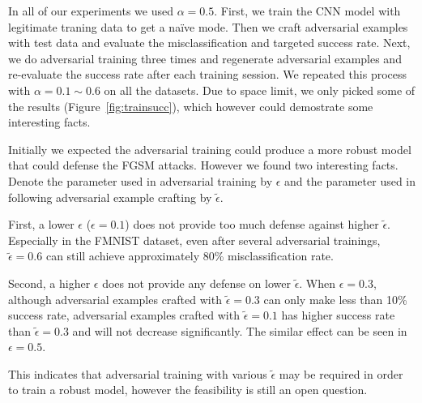 \documentclass{article}
\begin{document}
In all of our experiments we used $\alpha=0.5$. First, we train the CNN model with legitimate traning data to get a na\"ive mode.
Then we craft adversarial examples with test data and evaluate the misclassification and targeted success rate.
Next, we do adversarial training three times and regenerate adversarial examples and re-evaluate the success rate after each training session.
We repeated this process with $\alpha=0.1\sim 0.6$ on all the datasets.
Due to space limit, we only picked some of the results (Figure~\ref{fig:trainsucc}), which however could demostrate some interesting facts.

Initially we expected the adversarial training could produce a more robust model that could defense the FGSM attacks. However we found two interesting facts.
Denote the parameter used in adversarial training by $\epsilon$ and the parameter used in following adversarial example crafting by $\tilde{\epsilon}$.

First, a lower $\epsilon$ ($\epsilon = 0.1$) does not provide too much defense against higher $\tilde{\epsilon}$. Especially in the FMNIST dataset, 
even after several adversarial trainings, $\tilde{\epsilon}=0.6$ can still achieve approximately 80\% misclassification rate.

Second, a higher $\epsilon$ does not provide any defense on lower $\tilde{\epsilon}$. When $\epsilon=0.3$, although adversarial examples crafted with $\tilde{\epsilon}=0.3$
can only make less than 10\% success rate, adversarial examples crafted with $\tilde{\epsilon}=0.1$ has higher success rate than $\tilde{\epsilon}=0.3$ and will not decrease
significantly. The similar effect can be seen in $\epsilon=0.5$.

This indicates that adversarial training with various $\tilde{\epsilon}$ may be required in order to train a robust model, however the feasibility is still an open question.
\end{document}
